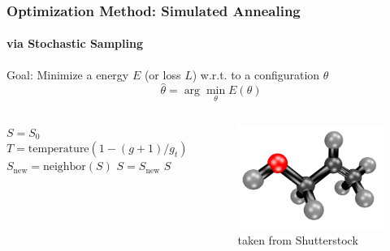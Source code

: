 \documentclass[xcolor=dvipsnames,envcountsect]{beamer}
\begin{document}

\begin{frame}[fragile]\frametitle{Optimization Method: Simulated Annealing}\framesubtitle{via Stochastic Sampling}
Goal: Minimize a energy $E$ (or loss $L$) w.r.t. to a configuration $\theta$
$$ 
\widehat{\theta} = \arg\min_{\theta} E(\theta)
$$
\begin{columns}
\begin{algorithm}[H]
\begin{algorithmic}[1]
\STATE $S = S_0$
\STATE $T = \text{temperature}(1 - (g+1) / g_t)$ 
\STATE $S_{\text{new}} = \text{neighbor}(S)$
    \STATE $S = S_{\text{new}}$
\ENDIF
\ENDFOR
\RETURN $S$
\end{algorithmic}
\end{algorithm}

\begin{figure}\centering
    \includegraphics[scale=.2]{molecule.png}
  \caption{taken from Shutterstock}
\end{figure}
\end{columns}

\end{frame}
\end{document}
